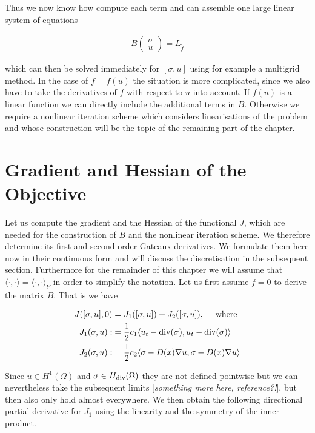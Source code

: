 \documentclass[../draft_1.tex]{subfiles}
\begin{document}
Thus we now know how compute each term and can assemble one large linear system of equations
\begin{ceqn}
	\begin{align}
B
\begin{pmatrix}
\sigma \\
u
\end{pmatrix} = L_{\tilde{f}}
	\end{align}
\end{ceqn}
which can then be solved immediately for $[\sigma, u]$ using for example a multigrid method. In the case of $f = f(u)$ the situation is more complicated, since we also have to take the derivatives of $f$ with respect to $u$ into account. If $f(u)$ is a linear function we can directly include the additional terms in $B$. Otherwise we require a nonlinear iteration scheme which considers linearisations of the problem and whose construction will be the topic of the remaining part of the chapter. 

\section{Gradient and Hessian of the Objective}
Let us compute the gradient and the Hessian of the functional $J$, which are needed for the construction of $B$ and the nonlinear iteration scheme. We therefore determine its first and second order Gateaux derivatives. We formulate them here now in their continuous form and will discuss the discretisation in the subsequent section. Furthermore for the remainder of this chapter we will assume that $\langle \cdot, \cdot \rangle = \langle \cdot, \cdot \rangle _Y$ in order to simplify the notation. Let us first assume $f = 0$ to derive the matrix $B$. That is we have 

\begin{equation}
\begin{aligned}
J([\sigma, u], 0)& = J_1([\sigma, u]) + J_2([\sigma, u]), \quad \text{ where } \\
J_1(\sigma, u) : &= \frac{1}{2}c_1\langle u_t - \mathop{}\!\mathrm{div}(\sigma), u_t - \mathop{}\!\mathrm{div}(\sigma) \rangle \\
J_2(\sigma, u) :&= \frac{1}{2} c_2\langle \sigma - D(x) \nabla u, \sigma  - D(x) \nabla u \rangle
\end{aligned}
\end{equation}

Since $u \in H^1(\Omega)$ and $\sigma \in H_{\mathop{}\!\mathrm{div}}(\Omega)$ they are not defined pointwise but we can nevertheless take the subsequent limits [\textit{something more here, reference?!}], but then also only hold almost everywhere. We then obtain the following directional partial derivative for $J_1$ using the linearity and the symmetry of the inner product. 
\end{document}
